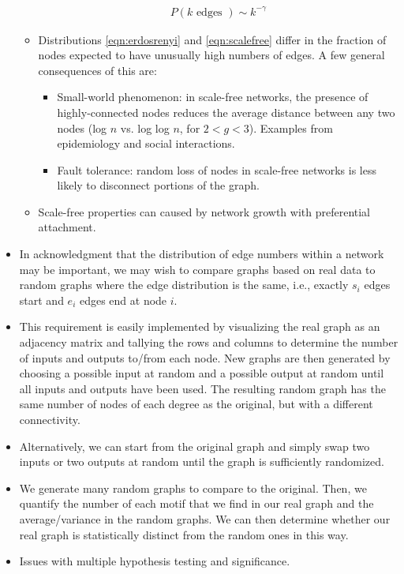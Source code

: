 \documentclass{article}
\begin{document}
\begin{itemize}
\begin{itemize}
\begin{eqnarray}
P(k \textrm{ edges }) \sim k^{-\gamma} \label{eqn:scalefree}
\end{eqnarray}

\item Distributions \ref{eqn:erdosrenyi} and \ref{eqn:scalefree} differ in the fraction of nodes expected to have unusually high numbers of edges. A few general consequences of this are:

\begin{itemize}
\item Small-world phenomenon: in scale-free networks, the presence of highly-connected nodes reduces the average distance between any two nodes (log $n$ vs. log log $n$, for $2<g<3$). Examples from epidemiology and social interactions.
\item Fault tolerance: random loss of nodes in scale-free networks is less likely to disconnect portions of the graph.
\end{itemize}

\item Scale-free properties can caused by network growth with preferential attachment.
\end{itemize}
\item In acknowledgment that the distribution of edge numbers within a network may be important, we may wish to compare graphs based on real data to random graphs where the edge distribution is the same, i.e., exactly $s_i$ edges start and $e_i$ edges end at node $i$.

\item This requirement is easily implemented by visualizing the real graph as an adjacency matrix and tallying the rows and columns to determine the number of inputs and outputs to/from each node. New graphs are then generated by choosing a possible input at random and a possible output at random until all inputs and outputs have been used. The resulting random graph has the same number of nodes of each degree as the original, but with a different connectivity.

\item Alternatively, we can start from the original graph and simply swap two inputs or two outputs at random until the graph is sufficiently randomized.

\item We generate many random graphs to compare to the original. Then, we quantify the number of each motif that we find in our real graph  and the average/variance in the random graphs. We can then determine whether our real graph is statistically distinct from the random ones in this way.

\item Issues with multiple hypothesis testing and significance.

\end{itemize}
\end{document}
